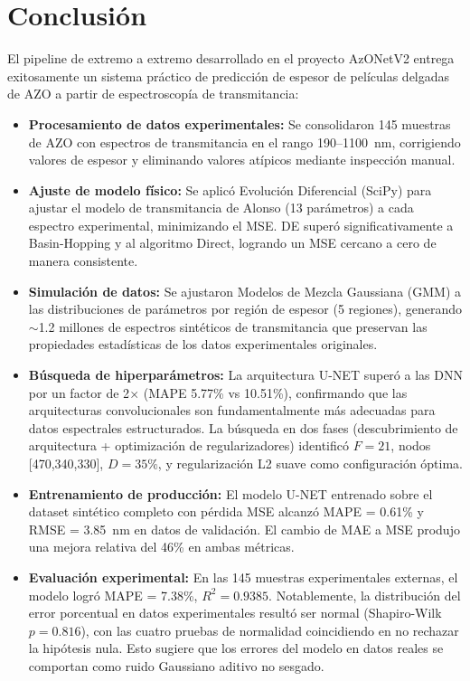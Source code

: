 \documentclass{article}
\begin{document}
\section{Conclusión}
\label{sec:conclusion}

El pipeline de extremo a extremo desarrollado en el proyecto AzONetV2 entrega exitosamente un sistema práctico de predicción de espesor de películas delgadas de AZO a partir de espectroscopía de transmitancia:

\begin{itemize}
\item \textbf{Procesamiento de datos experimentales:} Se consolidaron 145 muestras de AZO con espectros de transmitancia en el rango 190--1100~nm, corrigiendo valores de espesor y eliminando valores atípicos mediante inspección manual.

\item \textbf{Ajuste de modelo físico:} Se aplicó Evolución Diferencial (SciPy) para ajustar el modelo de transmitancia de Alonso (13 parámetros) a cada espectro experimental, minimizando el MSE. DE superó significativamente a Basin-Hopping y al algoritmo Direct, logrando un MSE cercano a cero de manera consistente.

\item \textbf{Simulación de datos:} Se ajustaron Modelos de Mezcla Gaussiana (GMM) a las distribuciones de parámetros por región de espesor (5 regiones), generando $\sim$1.2 millones de espectros sintéticos de transmitancia que preservan las propiedades estadísticas de los datos experimentales originales.

\item \textbf{Búsqueda de hiperparámetros:} La arquitectura U-NET superó a las DNN por un factor de 2$\times$ (MAPE 5.77\% vs 10.51\%), confirmando que las arquitecturas convolucionales son fundamentalmente más adecuadas para datos espectrales estructurados. La búsqueda en dos fases (descubrimiento de arquitectura + optimización de regularizadores) identificó $F=21$, nodos [470,340,330], $D=35\%$, y regularización L2 suave como configuración óptima.

\item \textbf{Entrenamiento de producción:} El modelo U-NET entrenado sobre el dataset sintético completo con pérdida MSE alcanzó MAPE = 0.61\% y RMSE = 3.85~nm en datos de validación. El cambio de MAE a MSE produjo una mejora relativa del 46\% en ambas métricas.

\item \textbf{Evaluación experimental:} En las 145 muestras experimentales externas, el modelo logró MAPE = 7.38\%, $R^2 = 0.9385$. Notablemente, la distribución del error porcentual en datos experimentales resultó ser normal (Shapiro-Wilk $p = 0.816$), con las cuatro pruebas de normalidad coincidiendo en no rechazar la hipótesis nula. Esto sugiere que los errores del modelo en datos reales se comportan como ruido Gaussiano aditivo no sesgado.
\end{itemize}
\end{document}
